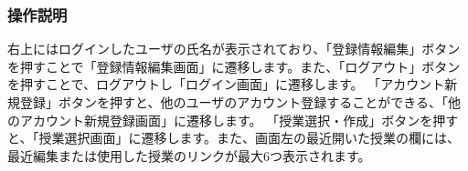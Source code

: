 \subsubsection{操作説明}
右上にはログインしたユーザの氏名が表示されており、「登録情報編集」ボタンを押すことで「登録情報編集画面」に遷移します。また、「ログアウト」ボタンを押すことで、ログアウトし「ログイン画面」に遷移します。
「アカウント新規登録」ボタンを押すと、他のユーザのアカウント登録することができる、「他のアカウント新規登録画面」に遷移します。
「授業選択・作成」ボタンを押すと、「授業選択画面」に遷移します。また、画面左の最近開いた授業の欄には、最近編集または使用した授業のリンクが最大6つ表示されます。




